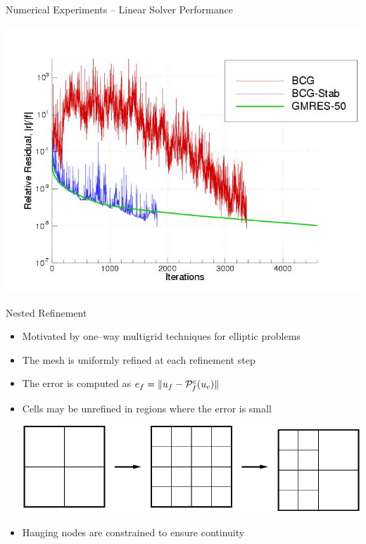 \documentclass[landscape,pdftex,headrule,footrule]{foils}
\begin{document}
\begin{foil}[-.5in]{Numerical Experiments -- Linear Solver Performance}
  \centerline{\includegraphics[width=.9\textwidth]{figures/history}}
\end{foil}



\begin{foil}[-.25in]{Nested Refinement}
  \begin{itemize}
    \item Motivated by one--way multigrid techniques for elliptic problems
    \item The mesh is uniformly refined at each refinement step
    \item The error is computed as $e_f=\|u_{f} - {\cal P}_f^c (u_{c}) \|$
    \item Cells may be unrefined in regions where the error is small
      \vspace{.25in}
      \centerline{\includegraphics[height=.2\textheight]{figures/refine2}}
    \item Hanging nodes are constrained to ensure continuity
  \end{itemize}
\end{foil}
\end{document}
